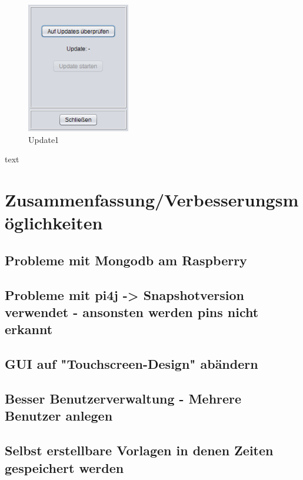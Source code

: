 \begin{figure}
\vspace{-20pt}
  \begin{center}
    \includegraphics[width=0.40\textwidth]{Bilder/GUI/Update1}
  \end{center}
  \caption{Update1}
  \label{Update}
  \vspace{-40pt}
\end{figure}
text

\section{Zusammenfassung/Verbesserungsmöglichkeiten}
\subsection{Probleme mit Mongodb am Raspberry}
\subsection{Probleme mit pi4j -> Snapshotversion verwendet - ansonsten werden pins nicht erkannt}
\subsection{GUI auf "Touchscreen-Design" abändern}
\subsection{Besser Benutzerverwaltung - Mehrere Benutzer anlegen}
\subsection{Selbst erstellbare Vorlagen in denen Zeiten gespeichert werden}
